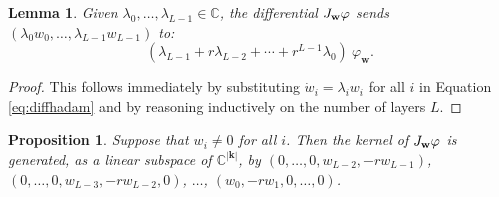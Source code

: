 \documentclass[twoside]{article}
\theoremstyle{plain}%
\newtheorem{prop}[thm]{Proposition}
\newtheorem{lem}[thm]{Lemma}
\theoremstyle{definition}
\theoremstyle{remark}
\begin{document}
\begin{lem}\label{lemm:homogendiff}
Given $\lambda_0, \ldots, \lambda_{L-1} \in \mathbb{C}$, the differential $\textnormal{J}_\mathbf{w} \varphi$ sends $(\lambda_{0}w_{0}, \ldots, \lambda_{L-1} w_{L-1})$ to:
\begin{equation}
    (\lambda_{L-1} + r \lambda_{L-2} + \cdots + r^{L-1}\lambda_0) \ \varphi_\mathbf{w}. 
\end{equation}
\end{lem}
\begin{proof}
This follows immediately by substituting $\dot{w}_i = \lambda_i w_i$ for all $i$ in Equation \ref{eq:diffhadam} and by reasoning inductively on the number of layers $L$. 
\end{proof}

\begin{prop}\label{prop:kerdiff}
Suppose that $w_i \not = 0 $ for all $i$. Then the kernel of $\textnormal{J}_\mathbf{w} \varphi$ is generated, as a linear subspace of $\mathbb{C}^{|\mathbf{k}|}$, by $(0,\ldots,   0, w_{L-2}, -rw_{L-1})$, $(0, \ldots, 0, w_{L-3}, -rw_{L-2},0)$, $\ldots$, $(w_0, -rw_1, 0, \ldots, 0)$. 
\end{prop}
\end{document}
